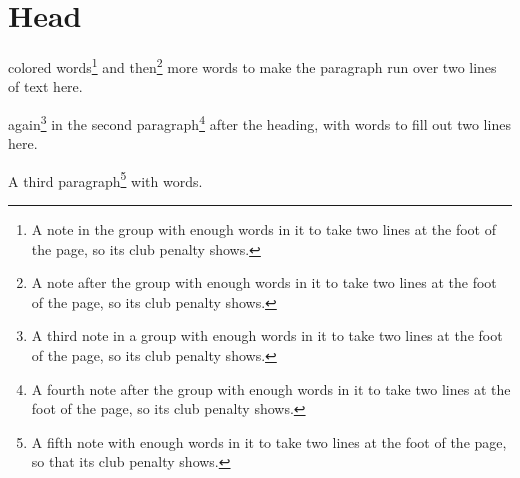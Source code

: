 \documentclass{article}
\begin{document}
\section{Head}
{\color{red} colored words\footnote{A note in the group with enough words in it to take two lines at the foot of the page, so its club penalty shows.}} and then\footnote{A note after the group with enough words in it to take two lines at the foot of the page, so its club penalty shows.} more words to make the paragraph run over two lines of text here.

{\color{blue} again\footnote{A third note in a group with enough words in it to take two lines at the foot of the page, so its club penalty shows.}} in the second paragraph\footnote{A fourth note after the group with enough words in it to take two lines at the foot of the page, so its club penalty shows.} after the heading, with words to fill out two lines here.

A third paragraph\footnote{A fifth note with enough words in it to take two lines at the foot of the page, so that its club penalty shows.} with words.
\end{document}
